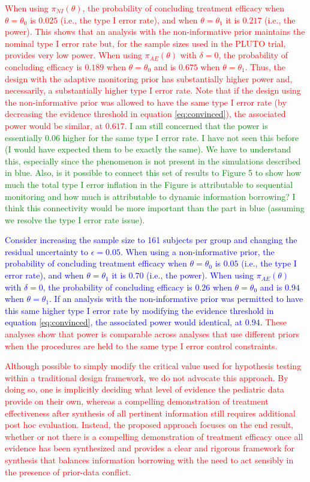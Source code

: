 \documentclass[12pt]{article}
\begin{document}
\textcolor{red}{
When using $\pi_{NI}(\theta)$, the probability of concluding treatment efficacy when $\theta=\theta_0$ is $0.025$ (i.e., the type I error rate), and when $\theta=\theta_1$ it is $0.217$ (i.e., the power). This shows that an analysis with the non-informative prior maintains the nominal type I error rate but, for the sample sizes used in the PLUTO trial, provides very low power. When using $\pi_{AE}(\theta)$ with $\delta=0$, the probability of concluding efficacy is $0.189$ when $\theta=\theta_0$ and is $0.675$ when $\theta=\theta_1$. Thus, the design with the adaptive monitoring prior has substantially higher power and, necessarily, a substantially higher type I error rate.
%
Note that if the design using the non-informative prior was allowed to have the same type I error rate (by decreasing the evidence threshold in equation \eqref{eq:convinced}), the associated power would be similar, at $0.617$.}
\textcolor{green}{I am still concerned that the power is essentially 0.06 higher for the same type I error rate. I have not seen this before (I would have expected them to be exactly the same). We have to understand this, especially since the phenomenon is not present in the simulations described in blue. Also, is it possible to connect this set of results to Figure 5 to show how much the total type I error inflation in the Figure is attributable to sequential monitoring and how much is attributable to dynamic information borrowing? I think this connectivity would be more important than the part in blue (assuming we resolve the type I error rate issue).}

\textcolor{blue}{Consider increasing the sample size to 161 subjects per group and changing the residual uncertainty to $\epsilon=0.05$. When using a non-informative prior, the probability of concluding treatment efficacy when $\theta=\theta_0$ is $0.05$ (i.e., the type I error rate), and when $\theta=\theta_1$ it is $0.70$ (i.e., the power). When using $\pi_{AE}(\theta)$ with $\delta=0$, the probability of concluding efficacy is $0.26$ when $\theta=\theta_0$ and is $0.94$ when $\theta=\theta_1$. If an analysis with the non-informative prior was permitted to have this same higher type I error rate by modifying the evidence threshold in equation \eqref{eq:convinced}, the associated power would identical, at $0.94$. } \textcolor{red}{These analyses show that power is comparable across analyses that use different priors when the procedures are held to the same type I error control constraints.}

\textcolor{red}{Although possible to simply modify the critical value used for hypothesis testing within a traditional design framework, we do not advocate this approach. By doing so, one is implicitly deciding what level of evidence the pediatric data provide on their own, whereas a compelling demonstration of treatment effectiveness after synthesis of all pertinent information still requires additional post hoc evaluation. Instead, the proposed approach focuses on the end result, whether or not there is a compelling demonstration of treatment efficacy once all evidence has been synthesized and provides a clear and rigorous framework for synthesis that balances information borrowing with the need to act sensibly in the presence of prior-data conflict.
}
\end{document}
